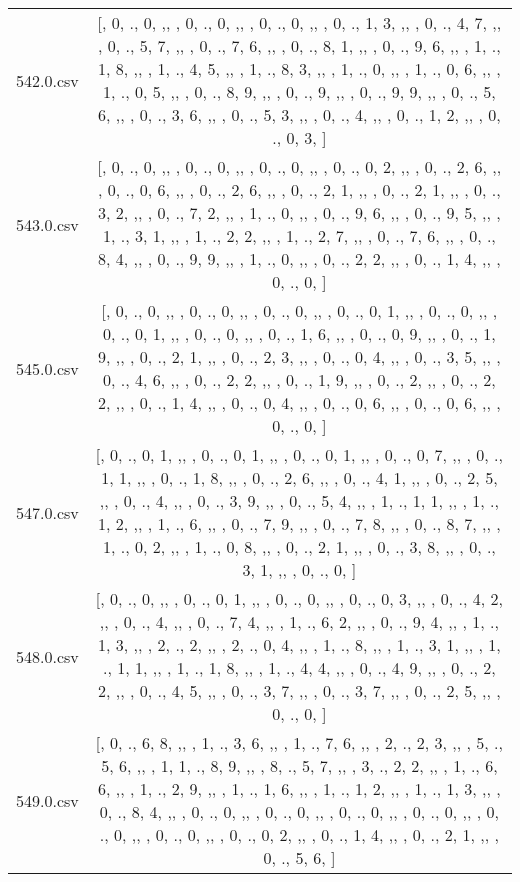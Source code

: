 \begin{table}[ht]
\begin{tabular}{@{}c c@{}}
	542.0.csv & [, 0, ., 0, ,,  , 0, ., 0, ,,  , 0, ., 0, ,,  , 0, ., 1, 3, ,,  , 0, ., 4, 7, ,,  , 0, ., 5, 7, ,,  , 0, ., 7, 6, ,,  , 0, ., 8, 1, ,,  , 0, ., 9, 6, ,,  , 1, ., 1, 8, ,,  , 1, ., 4, 5, ,,  , 1, ., 8, 3, ,,  , 1, ., 0, ,,  , 1, ., 0, 6, ,,  , 1, ., 0, 5, ,,  , 0, ., 8, 9, ,,  , 0, ., 9, ,,  , 0, ., 9, 9, ,,  , 0, ., 5, 6, ,,  , 0, ., 3, 6, ,,  , 0, ., 5, 3, ,,  , 0, ., 4, ,,  , 0, ., 1, 2, ,,  , 0, ., 0, 3, ]\\ 
	543.0.csv & [, 0, ., 0, ,,  , 0, ., 0, ,,  , 0, ., 0, ,,  , 0, ., 0, 2, ,,  , 0, ., 2, 6, ,,  , 0, ., 0, 6, ,,  , 0, ., 2, 6, ,,  , 0, ., 2, 1, ,,  , 0, ., 2, 1, ,,  , 0, ., 3, 2, ,,  , 0, ., 7, 2, ,,  , 1, ., 0, ,,  , 0, ., 9, 6, ,,  , 0, ., 9, 5, ,,  , 1, ., 3, 1, ,,  , 1, ., 2, 2, ,,  , 1, ., 2, 7, ,,  , 0, ., 7, 6, ,,  , 0, ., 8, 4, ,,  , 0, ., 9, 9, ,,  , 1, ., 0, ,,  , 0, ., 2, 2, ,,  , 0, ., 1, 4, ,,  , 0, ., 0, ]\\ 
	545.0.csv & [, 0, ., 0, ,,  , 0, ., 0, ,,  , 0, ., 0, ,,  , 0, ., 0, 1, ,,  , 0, ., 0, ,,  , 0, ., 0, 1, ,,  , 0, ., 0, ,,  , 0, ., 1, 6, ,,  , 0, ., 0, 9, ,,  , 0, ., 1, 9, ,,  , 0, ., 2, 1, ,,  , 0, ., 2, 3, ,,  , 0, ., 0, 4, ,,  , 0, ., 3, 5, ,,  , 0, ., 4, 6, ,,  , 0, ., 2, 2, ,,  , 0, ., 1, 9, ,,  , 0, ., 2, ,,  , 0, ., 2, 2, ,,  , 0, ., 1, 4, ,,  , 0, ., 0, 4, ,,  , 0, ., 0, 6, ,,  , 0, ., 0, 6, ,,  , 0, ., 0, ]\\ 
	547.0.csv & [, 0, ., 0, 1, ,,  , 0, ., 0, 1, ,,  , 0, ., 0, 1, ,,  , 0, ., 0, 7, ,,  , 0, ., 1, 1, ,,  , 0, ., 1, 8, ,,  , 0, ., 2, 6, ,,  , 0, ., 4, 1, ,,  , 0, ., 2, 5, ,,  , 0, ., 4, ,,  , 0, ., 3, 9, ,,  , 0, ., 5, 4, ,,  , 1, ., 1, 1, ,,  , 1, ., 1, 2, ,,  , 1, ., 6, ,,  , 0, ., 7, 9, ,,  , 0, ., 7, 8, ,,  , 0, ., 8, 7, ,,  , 1, ., 0, 2, ,,  , 1, ., 0, 8, ,,  , 0, ., 2, 1, ,,  , 0, ., 3, 8, ,,  , 0, ., 3, 1, ,,  , 0, ., 0, ]\\ 
	548.0.csv & [, 0, ., 0, ,,  , 0, ., 0, 1, ,,  , 0, ., 0, ,,  , 0, ., 0, 3, ,,  , 0, ., 4, 2, ,,  , 0, ., 4, ,,  , 0, ., 7, 4, ,,  , 1, ., 6, 2, ,,  , 0, ., 9, 4, ,,  , 1, ., 1, 3, ,,  , 2, ., 2, ,,  , 2, ., 0, 4, ,,  , 1, ., 8, ,,  , 1, ., 3, 1, ,,  , 1, ., 1, 1, ,,  , 1, ., 1, 8, ,,  , 1, ., 4, 4, ,,  , 0, ., 4, 9, ,,  , 0, ., 2, 2, ,,  , 0, ., 4, 5, ,,  , 0, ., 3, 7, ,,  , 0, ., 3, 7, ,,  , 0, ., 2, 5, ,,  , 0, ., 0, ]\\ 
	549.0.csv & [, 0, ., 6, 8, ,,  , 1, ., 3, 6, ,,  , 1, ., 7, 6, ,,  , 2, ., 2, 3, ,,  , 5, ., 5, 6, ,,  , 1, 1, ., 8, 9, ,,  , 8, ., 5, 7, ,,  , 3, ., 2, 2, ,,  , 1, ., 6, 6, ,,  , 1, ., 2, 9, ,,  , 1, ., 1, 6, ,,  , 1, ., 1, 2, ,,  , 1, ., 1, 3, ,,  , 0, ., 8, 4, ,,  , 0, ., 0, ,,  , 0, ., 0, ,,  , 0, ., 0, ,,  , 0, ., 0, ,,  , 0, ., 0, ,,  , 0, ., 0, ,,  , 0, ., 0, 2, ,,  , 0, ., 1, 4, ,,  , 0, ., 2, 1, ,,  , 0, ., 5, 6, ]\\ 

\end{tabular}
\end{table}
